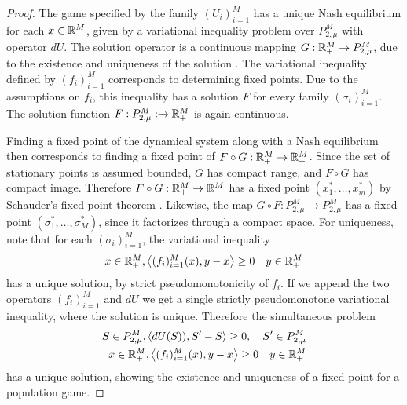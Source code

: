 \begin{proof}
  The game specified by the family $(U_i)_{i=1}^M$ has a unique Nash equilibrium for each $x\in \mathbb{R}^M$, given by a variational inequality problem over $P_{2,\mu}^M$ with operator $dU$. The solution operator is a continuous mapping $G: \mathbb{R}_+^M \to P_{2,\mu}^M$, due to the existence and uniqueness of the solution  \cite[Theorem 4.2]{barbagallo2009continuity}. The variational inequality defined by $(f_i)_{i=1}^M$ corresponds to determining fixed points. Due to the assumptions on $f_i$, this inequality has a solution $F$ for every family $(\sigma_i)_{i=1}^M$. The solution function $F:P_{2,\mu}^M: \to \mathbb{R}^M_+$ is again continuous.

  Finding a fixed point of the dynamical system along with a Nash equilibrium then corresponds to finding a fixed point of $F\circ G: \mathbb{R}_+^M \to \mathbb{R}_+^M$. Since the set of stationary points is assumed bounded, $G$ has compact range, and $F\circ G$ has compact image. Therefore $F\circ G:\mathbb{R}_+^M \to \mathbb{R}_+^M$ has a fixed point $(x_1^*, \dots, x_m^*)$ by Schauder's fixed point theorem \citep[Theorem 3.2, p. 119]{granas2003elementary}. Likewise, the map $G\circ F:P_{2,\mu}^M \to P_{2,\mu}^M$ has a fixed point $(\sigma_1^*,\dots, \sigma_M^*)$, since it factorizes through a compact space.
  For uniqueness, note that for each $(\sigma_i)_{i=1}^M$, the variational inequality
  \begin{equation}
    x \in \mathbb{R}_+^M, \left \langle (f_i)_{i=1}^M(x),y-x \right \rangle\geq 0 \quad y\in \mathbb{R}_+^M
  \end{equation}
  has a unique solution, by strict pseudomonotonicity of $f_i$. If we append the two operators $(f_i)_{i=1}^M$ and $dU$ we get a single strictly pseudomonotone variational inequality, where the solution is unique.
   Therefore the simultaneous problem
  \begin{equation}
    \begin{split}
    S\in P_{2,\mu}^M, \left \langle dU(S)),S'-S \right \rangle \geq 0, \quad S' \in P_{2,\mu}^M \\
    x \in \mathbb{R}_+^M, \left \langle (f_i)_{i=1}^M(x),y-x \right \rangle\geq 0 \quad y\in \mathbb{R}_+^M
  \end{split}
  \end{equation}
    has a unique solution, showing the existence and uniqueness of a fixed point for a population game.
\end{proof}

